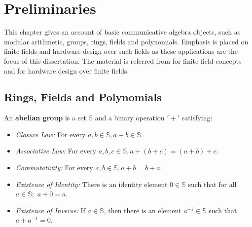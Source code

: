 \chapter{Preliminaries} \label{ch:prelim}
This chapter gives an account of basic communicative algebra objects, such as modular arithmetic, groups, rings, fields and polynomials.
Emphasis is placed on finite fields and hardware design over such fields as these applications are the focus of this dissertation. 
The material is referred from \cite{galois_field:mceliece} \cite{ftheory:2006} \cite{ff:1997} for finite field concepts and 
\cite{mastro:1989} \cite{PT:1985} \cite{acar:1998} \cite{wu:2002} \cite{Knezevic:2008} for hardware design over finite fields.



\section{Rings, Fields and Polynomials}

\begin{Definition}
An {\bf abelian group} is a set $\mathbb{S}$ and a binary operation $'+'$
satisfying: 
\begin{itemize} 
\item {\it Closure Law:} For every $a, b \in \mathbb{S}, a + b \in \mathbb{S}$. 
\item {\it Associative Law:} For every $a, b, c \in \mathbb{S}, a + (b + c) = (a + b) + c$. 
\item {\it Commutativity:} For every $a, b \in \mathbb{S}, a + b = b + a$. 
\item {\it Existence of Identity:} There is an identity element $0 \in \mathbb{S}$
such that for all $a \in \mathbb{S};$ $a + 0 = a$.
\item {\it Existence of Inverse:} If $a \in \mathbb{S}$, then there is an
element $a^{-1} \in \mathbb{S}$ such that $ a + a^{-1} = 0$.
\end{itemize}
\end{Definition}

